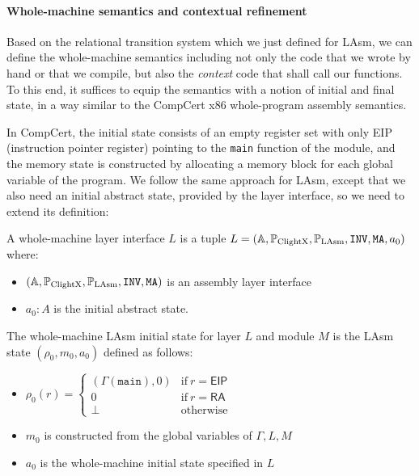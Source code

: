 \paragraph{Whole-machine semantics and contextual refinement}

Based on the relational transition system which we just defined for LAsm,
we can define the whole-machine semantics including not only the code
that we wrote by hand or that we compile, but also the \emph{context}
code that shall call our functions. To this end, it suffices to equip
the semantics with a notion of initial and final state, in a way
similar to the CompCert x86 whole-program assembly semantics.

In CompCert, the initial state consists of an empty register set
with only \textsf{EIP} (instruction pointer register) pointing to the \texttt{main} function of the
module, and the memory state is constructed by allocating a memory
block for each global variable of the program. We follow the same
approach for LAsm, except that we also need an initial abstract
state, provided by the layer interface, so
we need to extend its definition:

\begin{definition} \label{def:whole-machine-layer}
A whole-machine layer interface $L$ is a tuple
$L = (\mathbb{A}, \mathbb{P}_{\mathrm{ClightX}}, \mathbb{P}_{\mathrm{LAsm}}, {\texttt{INV}}, {\texttt{MA}}, a_0)$
where:
\begin{itemize}
\item $ (\mathbb{A}, \mathbb{P}_{\mathrm{ClightX}}, \mathbb{P}_{\mathrm{LAsm}}, {\texttt{INV}}, {\texttt{MA}}) $ is an assembly layer interface
\item $a_0 : A$ is the initial abstract state.
\end{itemize}
\end{definition}

\begin{definition}
The whole-machine LAsm initial state for layer $L$ and module $M$ is
the LAsm state $(\rho_0, m_0, a_0)$ defined as follows:
\begin{itemize}
\item $\rho_0(r) = \left\{ \begin{array}{ll}
(\Gamma(\mathtt{main}), 0) & \text{if} ~ r = \mathsf{EIP} \\
0 & \text{if} ~ r = \mathsf{RA} \\
\bot & \text{otherwise}
\end{array}
\right. $
\item $m_0$ is constructed from the global variables of $\Gamma, L, M$
\item $a_0$ is the whole-machine initial state specified in $L$
\end{itemize}
\end{definition}

